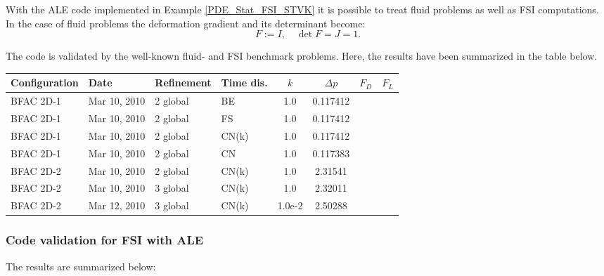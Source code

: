 With the ALE code implemented in Example 
\ref{PDE_Stat_FSI_STVK} it is possible to treat fluid 
problems as well as FSI computations. 
In the case of fluid problems the deformation
gradient and its determinant become:
\begin{equation*}
F:= I , \quad \det F = J = 1.
\end{equation*}

The code is validated by the well-known 
fluid- and FSI benchmark problems. Here, 
the results have been summarized in the table below.

 \begin{table}[h]
   \small
   \centering
     \begin{tabular}{llllcccc}    
       \hline
       Configuration & Date         & Refinement & Time dis. & $k$ & $\Delta p$& $F_D$ & $F_L$   \\ \hline\hline
       BFAC 2D-1     & Mar 10, 2010 & 2 global   & BE        & 1.0    & 0.117412  &       &         \\
       BFAC 2D-1     & Mar 10, 2010 & 2 global   & FS        & 1.0    & 0.117412  &       &         \\
       BFAC 2D-1     & Mar 10, 2010 & 2 global   & CN(k)     & 1.0    & 0.117412  &       &         \\ 
       BFAC 2D-1     & Mar 10, 2010 & 2 global   & CN        & 1.0    & 0.117383  &       &         \\ 
       BFAC 2D-2     & Mar 10, 2010 & 2 global   & CN(k)     & 1.0    & 2.31541   &       &         \\ 
       BFAC 2D-2     & Mar 10, 2010 & 3 global   & CN(k)     & 1.0    & 2.32011   &       &         \\   
       BFAC 2D-2     & Mar 12, 2010 & 3 global   & CN(k)     & 1.0e-2 & 2.50288   &       &         \\   
     \end{tabular}
  \end{table}
 
\subsubsection{Code validation for FSI with ALE}

The results are summarized below:

